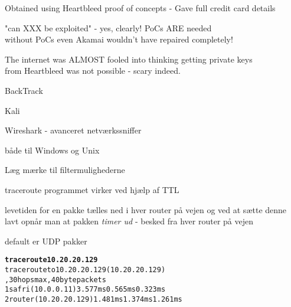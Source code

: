 \documentclass[20pt,landscape,a4paper,footrule]{foils}
\begin{document}
\begin{list2}
\item Obtained using Heartbleed proof of concepts - Gave full credit card details
\item "can XXX be exploited" - yes, clearly! PoCs ARE needed\\
without PoCs even Akamai wouldn't have repaired completely!
\item The internet was ALMOST fooled into thinking getting private keys\\
 from Heartbleed was not possible - scary indeed.
\end{list2}







\begin{list1}
\item BackTrack 
\item Kali 
\item Wireshark -  avanceret netværkssniffer
\end{list1}




\centerline{}
\centerline{både til Windows og Unix}




\centerline{Læg mærke til filtermulighederne}


\begin{list1}
  \item traceroute programmet virker ved hjælp af TTL
\item levetiden for en pakke tælles ned i hver router på vejen og ved at sætte denne lavt
  opnår man at pakken \emph{timer ud} - besked fra hver router på vejen
\item default er UDP pakker
\end{list1}

\begin{alltt}
{\bfseries  traceroute 10.20.20.129}
traceroute to 10.20.20.129 (10.20.20.129)\\
, 30 hops max, 40 byte packets
 1  safri (10.0.0.11)  3.577 ms  0.565 ms  0.323 ms
 2  router (10.20.20.129)  1.481 ms  1.374 ms  1.261 ms
\end{alltt}
\end{document}
